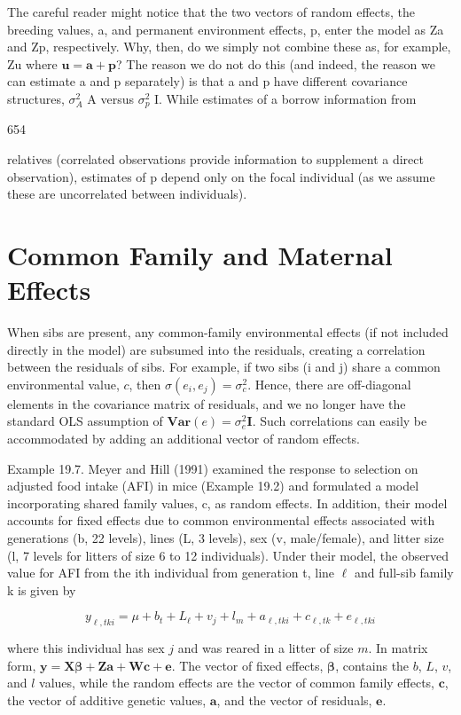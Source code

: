 \documentclass{article}
\begin{document}
The careful reader might notice that the two vectors of random effects, the breeding values, a, and permanent environment effects, p, enter the model as Za and Zp, respectively. Why, then, do we simply not combine these as, for example, Zu where  $ \mathbf{u} = \mathbf{a} + \mathbf{p} $? The reason we do not do this (and indeed, the reason we can estimate a and p separately) is that a and p have different covariance structures,  $ \sigma_A^2 $ A versus  $ \sigma_p^2 $ I. While estimates of a borrow information from

654

relatives (correlated observations provide information to supplement a direct observation), estimates of p depend only on the focal individual (as we assume these are uncorrelated between individuals).

\section{Common Family and Maternal Effects}
When sibs are present, any common-family environmental effects (if not included directly in the model) are subsumed into the residuals, creating a correlation between the residuals of sibs. For example, if two sibs (i and j) share a common environmental value,  $ c $, then  $ \sigma(e_i, e_j) = \sigma_c^2 $. Hence, there are off-diagonal elements in the covariance matrix of residuals, and we no longer have the standard OLS assumption of  $ \mathbf{Var}(e) = \sigma_e^2 \mathbf{I} $. Such correlations can easily be accommodated by adding an additional vector of random effects.

Example 19.7. Meyer and Hill (1991) examined the response to selection on adjusted food intake (AFI) in mice (Example 19.2) and formulated a model incorporating shared family values, c, as random effects. In addition, their model accounts for fixed effects due to common environmental effects associated with generations (b, 22 levels), lines (L, 3 levels), sex (v, male/female), and litter size (l, 7 levels for litters of size 6 to 12 individuals). Under their model, the observed value for AFI from the ith individual from generation t, line  $ \ell $ and full-sib family k is given by

\begin{equation}
y_{\ell,t k i}=\mu+b_{t}+L_{\ell}+v_{j}+l_{m}+a_{\ell,t k i}+c_{\ell,t k}+e_{\ell,t k i}
\end{equation}

where this individual has sex $j$ and was reared in a litter of size $m$. In matrix form, $\mathbf{y} = \mathbf{X}\boldsymbol{\beta} + \mathbf{Z}\mathbf{a} + \mathbf{W}\mathbf{c} + \mathbf{e}$. The vector of fixed effects, $\boldsymbol{\beta}$, contains the $b$, $L$, $v$, and $l$ values, while the random effects are the vector of common family effects, $\mathbf{c}$, the vector of additive genetic values, $\mathbf{a}$, and the vector of residuals, $\mathbf{e}$.
\end{document}
